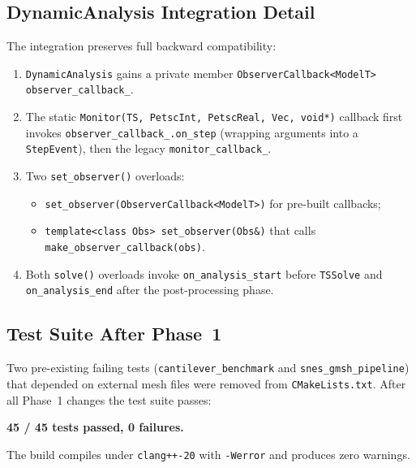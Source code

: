 \subsection{DynamicAnalysis Integration Detail}
\label{sec:impl-da-integration}

The integration preserves full backward compatibility:

\begin{enumerate}
  \item \texttt{DynamicAnalysis} gains a private member
    \texttt{ObserverCallback<ModelT> observer\_callback\_}.
  \item The static \texttt{Monitor(TS, PetscInt, PetscReal, Vec, void*)}
    callback first invokes \texttt{observer\_callback\_.on\_step}
    (wrapping arguments into a \texttt{StepEvent}), then the legacy
    \texttt{monitor\_callback\_}.
  \item Two \texttt{set\_observer()} overloads:
    \begin{itemize}
      \item \texttt{set\_observer(ObserverCallback<ModelT>)} for
            pre-built callbacks;
      \item \texttt{template<class Obs> set\_observer(Obs\&)} that
            calls \texttt{make\_observer\_callback(obs)}.
    \end{itemize}
  \item Both \texttt{solve()} overloads invoke
    \texttt{on\_analysis\_start} before \texttt{TSSolve} and
    \texttt{on\_analysis\_end} after the post-processing phase.
\end{enumerate}

\subsection{Test Suite After Phase~1}
\label{sec:impl-test-suite}

Two pre-existing failing tests (\texttt{cantilever\_benchmark} and
\texttt{snes\_gmsh\_pipeline}) that depended on external mesh files
were removed from \texttt{CMakeLists.txt}.  After all Phase~1 changes
the test suite passes:

\begin{center}
  \textbf{45 / 45 tests passed, 0 failures.}
\end{center}

The build compiles under \texttt{clang++-20} with \texttt{-Werror}
and produces zero warnings.


